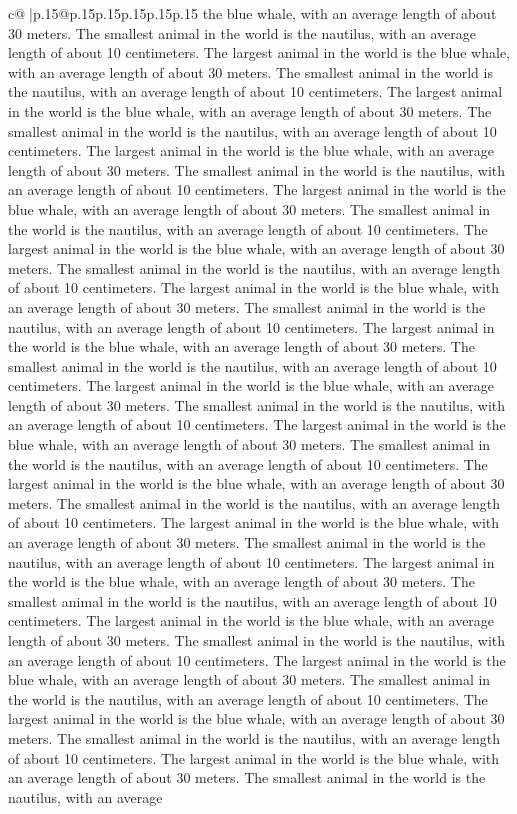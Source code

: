 \documentclass{article}
\begin{document}
{\begin{supertabular}{c@{$\;$}|p{.15\linewidth}@{}p{.15\linewidth}p{.15\linewidth}p{.15\linewidth}p{.15\linewidth}p{.15\linewidth}}
{{{the blue whale, with an average length of about 30 meters. The smallest animal in the world is the nautilus, with an average length of about 10 centimeters. The largest animal in the world is the blue whale, with an average length of about 30 meters. The smallest animal in the world is the nautilus, with an average length of about 10 centimeters. The largest animal in the world is the blue whale, with an average length of about 30 meters. The smallest animal in the world is the nautilus, with an average length of about 10 centimeters. The largest animal in the world is the blue whale, with an average length of about 30 meters. The smallest animal in the world is the nautilus, with an average length of about 10 centimeters. The largest animal in the world is the blue whale, with an average length of about 30 meters. The smallest animal in the world is the nautilus, with an average length of about 10 centimeters. The largest animal in the world is the blue whale, with an average length of about 30 meters. The smallest animal in the world is the nautilus, with an average length of about 10 centimeters. The largest animal in the world is the blue whale, with an average length of about 30 meters. The smallest animal in the world is the nautilus, with an average length of about 10 centimeters. The largest animal in the world is the blue whale, with an average length of about 30 meters. The smallest animal in the world is the nautilus, with an average length of about 10 centimeters. The largest animal in the world is the blue whale, with an average length of about 30 meters. The smallest animal in the world is the nautilus, with an average length of about 10 centimeters. The largest animal in the world is the blue whale, with an average length of about 30 meters. The smallest animal in the world is the nautilus, with an average length of about 10 centimeters. The largest animal in the world is the blue whale, with an average length of about 30 meters. The smallest animal in the world is the nautilus, with an average length of about 10 centimeters. The largest animal in the world is the blue whale, with an average length of about 30 meters. The smallest animal in the world is the nautilus, with an average length of about 10 centimeters. The largest animal in the world is the blue whale, with an average length of about 30 meters. The smallest animal in the world is the nautilus, with an average length of about 10 centimeters. The largest animal in the world is the blue whale, with an average length of about 30 meters. The smallest animal in the world is the nautilus, with an average length of about 10 centimeters. The largest animal in the world is the blue whale, with an average length of about 30 meters. The smallest animal in the world is the nautilus, with an average length of about 10 centimeters. The largest animal in the world is the blue whale, with an average length of about 30 meters. The smallest animal in the world is the nautilus, with an average length of about 10 centimeters. The largest animal in the world is the blue whale, with an average length of about 30 meters. The smallest animal in the world is the nautilus, with an average }}}
\end{supertabular}}
\end{document}
